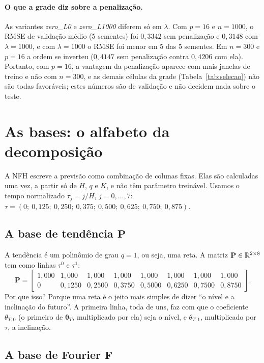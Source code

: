 \documentclass[11pt,a4paper]{article}
\newcommand{\bP}{\mathbf{P}}\newcommand{\bF}{\mathbf{F}}\newcommand{\bFt}{\widetilde{\mathbf{F}}}\newcommand{\bQ}{\mathbf{Q}}
\newcommand{\thT}{\boldsymbol{\theta}_T}\newcommand{\thS}{\boldsymbol{\theta}_S}\newcommand{\bu}{\mathbf{u}}
\begin{document}
\paragraph{O que a grade diz sobre a penalização.} As variantes \emph{zero\_L0} e \emph{zero\_L1000} diferem só em $\lambda$. Com $p=16$ e $n=1000$, o RMSE de validação médio (5 sementes) foi $0,3342$ sem penalização e $0,3148$ com $\lambda=1000$, e com $\lambda=1000$ o RMSE foi menor em 5 das 5 sementes. Em $n=300$ e $p=16$ a ordem se inverteu ($0,4147$ sem penalização contra $0,4206$ com ela). Portanto, com $p=16$, a vantagem da penalização aparece com mais janelas de treino e não com $n=300$, e as demais células da grade (Tabela~\ref{tab:selecao}) não são todas favoráveis; estes números são de validação e não decidem nada sobre o teste.

\section{As bases: o alfabeto da decomposição}\label{sec:bases}

A NFH escreve a previsão como combinação de colunas fixas. Elas são calculadas uma vez, a partir só de $H$, $q$ e $K$, e não têm parâmetro treinável. Usamos o tempo normalizado $\tau_j=j/H$, $j=0,\dots,7$: $\tau=(0;\allowbreak\ 0,125;\allowbreak\ 0,250;\allowbreak\ 0,375;\allowbreak\ 0,500;\allowbreak\ 0,625;\allowbreak\ 0,750;\allowbreak\ 0,875)$.

\subsection{A base de tendência $\bP$}

A tendência é um polinômio de grau $q=1$, ou seja, uma reta. A matriz $\bP\in\R^{2\times 8}$ tem como linhas $\tau^0$ e $\tau^1$:
\[\bP=\begin{bmatrix}1,000 & 1,000 & 1,000 & 1,000 & 1,000 & 1,000 & 1,000 & 1,000 \\ 0 & 0,1250 & 0,2500 & 0,3750 & 0,5000 & 0,6250 & 0,7500 & 0,8750\end{bmatrix}.\]
Por que isso? Porque uma reta é o jeito mais simples de dizer ``o nível e a inclinação do futuro''. A primeira linha, toda de uns, faz com que o coeficiente $\theta_{T,0}$ (o primeiro de $\thT$, multiplicado por ela) seja o nível, e $\theta_{T,1}$, multiplicado por $\tau$, a inclinação.

\subsection{A base de Fourier $\bF$}
\end{document}
